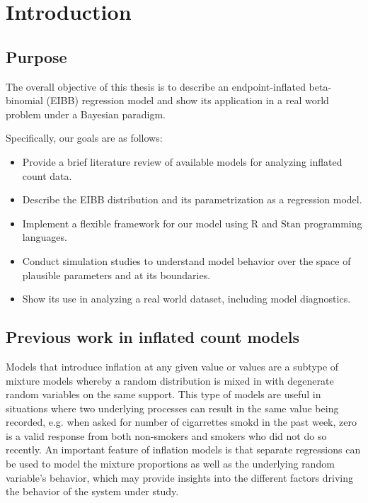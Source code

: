 \chapter{Introduction}
\label{cap:intro}

\section{Purpose}
\label{sec:objs}

The overall objective of this thesis is to describe an endpoint-inflated beta-binomial (EIBB) regression model and show its application in a real world problem under a Bayesian paradigm.

Specifically, our goals are as follows:

\begin{itemize}
\item Provide a brief literature review of available models for analyzing inflated count data.
\item Describe the EIBB distribution and its parametrization as a regression model.
\item Implement a flexible framework for our model using $\text{R}$ and $\text{Stan}$ programming languages.
\item Conduct simulation studies to understand model behavior over the space of plausible parameters and at its boundaries.
\item Show its use in analyzing a real world dataset, including model diagnostics.
\end{itemize}

\section{Previous work in inflated count models}
\label{sec:intro}

Models that introduce inflation at any given value or values are a subtype of mixture models whereby a random distribution is mixed in with degenerate random variables on the same support. This type of models are useful in situations where two underlying processes can result in the same value being recorded, e.g. when asked for number of cigarrettes smokd in the past week, zero is a valid response from both non-smokers and smokers who did not do so recently. An important feature of inflation models is that separate regressions can be used to model the mixture proportions as well as the underlying random variable's behavior, which may provide insights into the different factors driving the behavior of the system under study.

